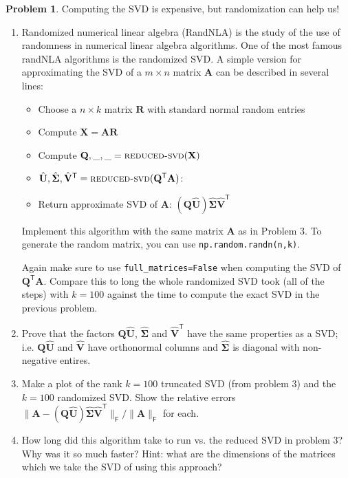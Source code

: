 \documentclass[12pt]{article}
\theoremstyle{definition}
\newtheorem{problem}{Problem}
\renewcommand{\vec}{\mathbf}
\newcommand{\T}{\mathsf{T}}
\newcommand{\F}{\mathsf{F}}
\begin{document}
\vspace{2em}
\begin{problem}
    Computing the SVD is expensive, but randomization can help us!
    \begin{enumerate}
        \item Randomized numerical linear algebra (RandNLA) is the study of the use of randomness in numerical linear algebra algorithms. 
            One of the most famous randNLA algorithms is the randomized SVD.
            A simple version for approximating the SVD of a $m\times n$ matrix $\vec{A}$ can be described in several lines:
            \begin{itemize}
                \item Choose a $n\times k$ matrix $\vec{R}$ with standard normal random entries
                \item Compute $\vec{X} = \vec{A} \vec{R}$
                \item Compute $\vec{Q},\_,\_ = \textsc{reduced-svd}(\vec{X})$
                \item 
                    $\hat{\vec{U}}, \hat{\vec{\Sigma}}, \hat{\vec{V}}^\T = \textsc{reduced-svd}(\vec{Q}^\T \vec{A})$: 
                \item Return approximate SVD of $\vec{A}$: $(\vec{Q} \hat{\vec{U}}) \hat{\vec{\Sigma}} \hat{\vec{V}}^\T$  
            \end{itemize}

            Implement this algorithm with the same matrix $\vec{A}$ as in Problem 3.
            To generate the random matrix, you can use \lstinline{np.random.randn(n,k)}.


            Again make sure to use \lstinline{full_matrices=False} when computing the SVD of $\vec{Q}^\T \vec{A}$.
            Compare this to long the whole randomized SVD took (all of the steps) with $k=100$ against the time to compute the exact SVD in the previous problem.
       
        \item Prove that the factors $\vec{Q}\hat{\vec{U}}$, $\hat{\vec{\Sigma}}$ and $\hat{\vec{V}}^\T$ have the same properties as a SVD; i.e. $\vec{Q}\hat{\vec{U}}$ and $\hat{\vec{V}}$ have orthonormal columns and $\hat{\vec{\Sigma}}$ is diagonal with non-negative entires.
        \item 
            Make a plot of the rank $k=100$ truncated SVD (from problem 3) and the $k=100$ randomized SVD.
            Show the relative errors $\|\vec{A} - (\vec{Q} \hat{\vec{U}})\hat{\vec{\Sigma}} \hat{\vec{V}}^\T \|_\F/\|\vec{A}\|_\F$ for each. 
        \item How long did this algorithm take to run vs. the reduced SVD in problem 3? Why was it so much faster? Hint: what are the dimensions of the matrices which we take the SVD of using this approach?

    \end{enumerate}
\end{problem}
\end{document}
